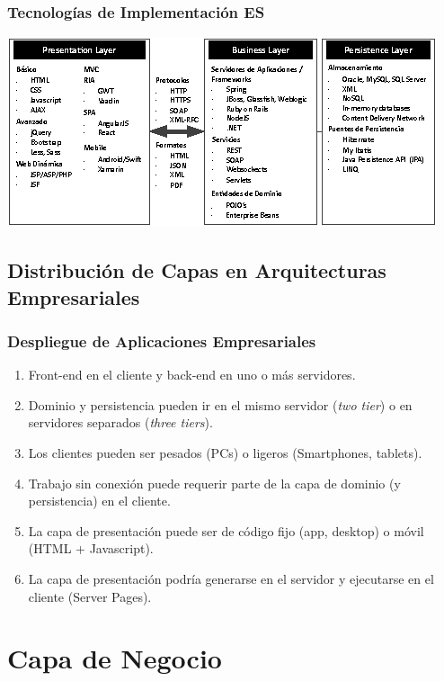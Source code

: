 \documentclass[a4paper,slidestop,xcolor=pst,dvips,blue]{beamer}
\begin{document}
\begin{frame}[c]
	\frametitle{Tecnologías de Implementación ES}
	\begin{center}
        \includegraphics[width=\linewidth,keepaspectratio=true]{images/enterpriseLayers/technologies.eps}
	\end{center}
\end{frame}

\subsection{Distribución de Capas en Arquitecturas Empresariales}

\begin{frame}[c]
	\frametitle{Despliegue de Aplicaciones Empresariales}
	\begin{enumerate}[<+->]
        \item Front-end en el cliente y back-end en uno o más servidores.
        \item Dominio y persistencia pueden ir en el mismo servidor (\emph{two tier}) o en servidores separados (\emph{three tiers}).
        \item Los clientes pueden ser pesados (PCs) o ligeros (Smartphones, tablets).
        \item Trabajo sin conexión puede requerir parte de la capa de dominio (y persistencia) en el cliente.
        \item La capa de presentación puede ser de código fijo (app, desktop) o móvil (HTML + Javascript).
        \item La capa de presentación podría generarse en el servidor y ejecutarse en el cliente (Server Pages).
	\end{enumerate}
\end{frame}

\section{Capa de Negocio}
\end{document}

